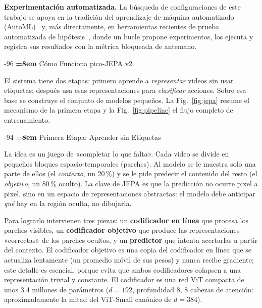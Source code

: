 \documentclass[runningheads]{llncs}
\makeatletter
\renewcommand\section{\@startsection{section}{1}{\z@}%
   {-9\p@ \@plus -2\p@ \@minus -2\p@}{6\p@ \@plus 2\p@ \@minus 2\p@}%
   {\normalfont\large\bfseries\boldmath\rightskip=\z@ \@plus 8em\pretolerance=10000 }}
\renewcommand\subsection{\@startsection{subsection}{2}{\z@}%
   {-9\p@ \@plus -2\p@ \@minus -2\p@}{4\p@ \@plus 2\p@ \@minus 2\p@}%
   {\normalfont\normalsize\bfseries\boldmath\rightskip=\z@ \@plus 8em\pretolerance=10000 }}
\makeatother
\begin{document}
\textbf{Experimentación automatizada.} La búsqueda de configuraciones de este
trabajo se apoya en la tradición del aprendizaje de máquina automatizado
(AutoML)~\cite{hutter2019automated} y, más directamente, en herramientas
recientes de prueba automatizada de hipótesis~\cite{karpathy2025autoresearch},
donde un bucle propone experimentos, los ejecuta y registra sus resultados con
la métrica bloqueada de antemano.

\section{Cómo Funciona pico-JEPA v2}
\label{sec:arch}

El sistema tiene dos etapas: primero aprende a \emph{representar} videos sin
usar etiquetas; después usa esas representaciones para \emph{clasificar}
acciones. Sobre esa base se construye el conjunto de modelos pequeños. La
Fig.~\ref{fig:jepa} resume el mecanismo de la primera etapa y la
Fig.~\ref{fig:pipeline} el flujo completo de entrenamiento.

\subsection{Primera Etapa: Aprender sin Etiquetas}

La idea es un juego de «completar lo que falta». Cada video se divide en
pequeños bloques espacio-temporales (parches). Al modelo se le muestra solo una
parte de ellos (el \emph{contexto}, un 20\,\%) y se le pide predecir el
contenido del resto (el \emph{objetivo}, un 80\,\% oculto). La clave de JEPA es
que la predicción no ocurre pixel a pixel, sino en un espacio de
representaciones abstractas: el modelo debe anticipar \emph{qué} hay en la
región oculta, no dibujarla.

Para lograrlo intervienen tres piezas: un \textbf{codificador en línea} que
procesa los parches visibles, un \textbf{codificador objetivo} que produce las
representaciones «correctas» de los parches ocultos, y un \textbf{predictor}
que intenta acertarlas a partir del contexto. El codificador objetivo es una
copia del codificador en línea que se actualiza lentamente (un promedio móvil
de sus pesos) y nunca recibe gradiente; este detalle es esencial, porque evita
que ambos codificadores colapsen a una representación trivial y constante. El
codificador es una red ViT compacta de unos 3.4 millones de parámetros
($d{=}192$, profundidad 8, 8 cabezas de atención: aproximadamente la mitad del
ViT-Small canónico de $d{=}384$).
\end{document}
